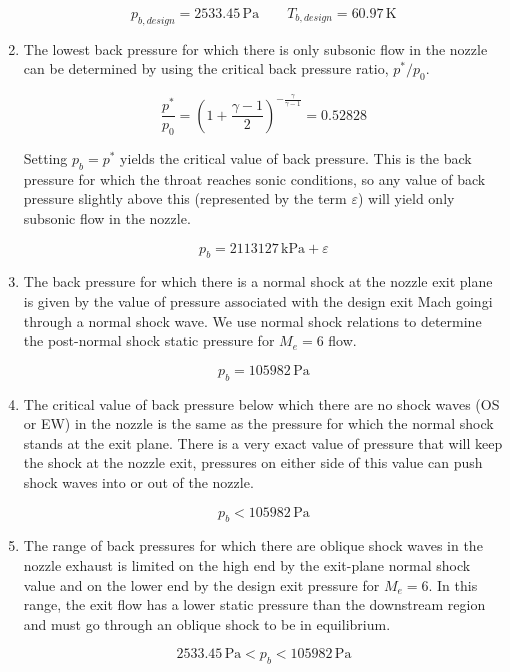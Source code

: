 \documentclass[../main.tex]{subfiles}
\begin{document}
\begin{enumerate}[label=(\alph*)]
    \[
        \boxed{p_{b,design} = 2533.45\,\unit{\pascal} \qquad T_{b,design} = 60.97\,\unit{\kelvin}}
    \]    
    
    \item The lowest back pressure for which there is only subsonic flow in the nozzle can be determined by using the critical back pressure ratio, \(p^*/p_0\).
    
    \[
        \frac{p^*}{p_0} = {\left(1 + \frac{\gamma-1}{2}\right)}^{-\frac{\gamma}{\gamma-1}} = 0.52828
    \]

    Setting \(p_b=p^*\) yields the critical value of back pressure.
    This is the back pressure for which the throat reaches sonic conditions, so any value of back pressure slightly above this (represented by the term \(\varepsilon\))  will yield only subsonic flow in the nozzle.

    \[
        \boxed{p_b = 2113127\,\unit{\kilo\pascal} + \varepsilon}
    \]

    \item The back pressure for which there is a normal shock at the nozzle exit plane is given by the value of pressure associated with the design exit Mach goingi through a normal shock wave.
    We use normal shock relations to determine the post-normal shock static pressure for \(M_e=6\) flow.

    \[
        \boxed{p_{b} = 105982 \, \unit{\pascal}}
    \]  

    \item The critical value of back pressure below which there are no shock waves (OS or EW) in the nozzle is the same as the pressure for which the normal shock stands at the exit plane.
    There is a very exact value of pressure that will keep the shock at the nozzle exit, pressures on either side of this value can push shock waves into or out of the nozzle.    
    
    \[
        \boxed{p_{b} < 105982 \, \unit{\pascal}}
    \]

    \item The range of back pressures for which there are oblique shock waves in the nozzle exhaust is limited on the high end by the exit-plane normal shock value and on the lower end by the design exit pressure for \(M_e=6\).
    In this range, the exit flow has a lower static pressure than the downstream region and must go through an oblique shock to be in equilibrium.
    
    \[
        \boxed{2533.45\,\unit{\pascal} < p_{b} < 105982 \, \unit{\pascal}}
    \]


\end{enumerate}
\end{document}
